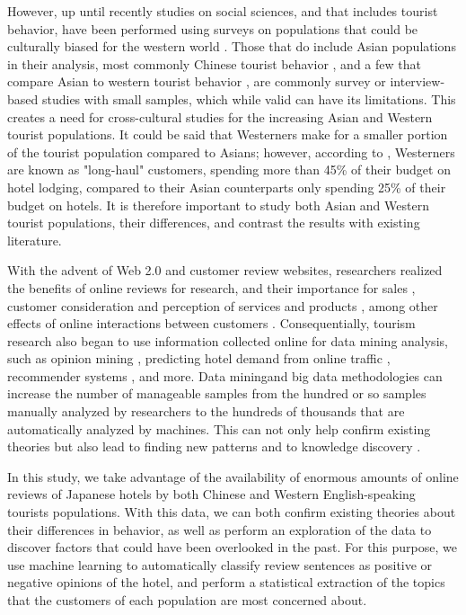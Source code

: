 \documentclass[review]{elsarticle}
\providecommand{\DIFadd}[1]{{\protect\color{blue}\uwave{#1}}} %
\providecommand{\DIFaddbegin}{} %
\providecommand{\DIFaddend}{} %
\newcommand{\DIFaddincludegraphics}[2][]{{\color{blue}\fbox{\DIFOincludegraphics[#1]{#2}}}} %
\DeclareRobustCommand{\DIFaddbegin}{\DIFOaddbegin \let\includegraphics\DIFaddincludegraphics} %
\DeclareRobustCommand{\DIFaddend}{\DIFOaddend \let\includegraphics\DIFOincludegraphics} %
\begin{document}
However, up until recently studies on social sciences, and that includes tourist behavior, have been performed using surveys on populations that could be culturally biased for the western world \cite[][]{nielsen2017, jones2010WEIRD, guaratne2009, hogan1978biases}. Those that do include Asian populations in their analysis, most commonly Chinese tourist behavior \cite[e.g.][]{liu2019, chang2010, dongyang2015}, and a few that compare Asian to western tourist behavior \cite[e.g.][]{choi2000}, are commonly survey or interview-based studies with small samples, which while valid can have its limitations. This creates a need for cross-cultural studies for the increasing Asian and Western tourist populations. It could be said that Westerners make for a smaller portion of the tourist population compared to Asians; however, according to \cite{choi2000}, Westerners are known as "long-haul" customers, spending more than 45\% of their budget on hotel lodging, compared to their Asian counterparts only spending 25\% of their budget on hotels. It is therefore important to study both Asian and Western tourist populations, their differences, and contrast the results with existing literature. 

With the advent of Web 2.0 and customer review websites, researchers realized the benefits of online reviews for research, and their importance for sales  \cite[][]{ye2009, basuroy2003}, customer consideration \cite[][]{vermeulen2009} and perception of services and products \cite[][]{browning2013}, among other effects of online interactions between customers \cite[e.g.][]{xiang2010, ren2019}. Consequentially, tourism research also began to use information collected online for data mining analysis, such as opinion mining \cite[e.g.][]{hu2017436}, predicting hotel demand from online traffic \cite[][]{yang2014}, recommender systems \cite[e.g.][]{loh2003}, and more. Data mining\DIFaddbegin \DIFadd{, machine learning }\DIFaddend and big data methodologies can increase the number of manageable samples from the hundred or so samples manually analyzed by researchers to the hundreds of thousands that are automatically analyzed by machines. This can not only help confirm existing theories but also lead to finding new patterns and to knowledge discovery \cite[][]{fayyad1996data}. 

In this study, we take advantage of the availability of enormous amounts of online reviews of Japanese hotels by both Chinese and Western English-speaking tourists populations. With this data, we can both confirm existing theories about their differences in behavior, as well as perform an exploration of the data to discover factors that could have been overlooked in the past. For this purpose, we use machine learning to automatically classify review sentences as positive or negative opinions of the hotel, and perform a statistical extraction of the topics that the customers of each population are most concerned about.
\end{document}
